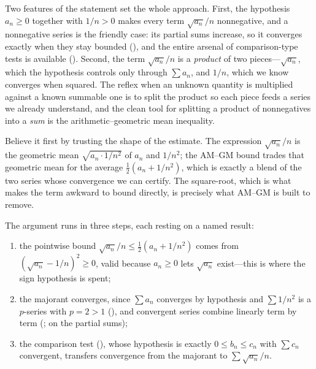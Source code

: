 \documentclass[main.tex]{subfiles}
\begin{document}
\begin{Reflection}
Two features of the statement set the whole approach. First, the hypothesis $a_n\ge 0$ together with
$1/n>0$ makes every term $\sqrt{a_n}/n$ nonnegative, and a nonnegative series is the friendly case: its
partial sums increase, so it converges exactly when they stay bounded (), and the entire
arsenal of comparison-type tests is available (). Second, the term $\sqrt{a_n}/n$ is a
\emph{product} of two pieces---$\sqrt{a_n}$, which the hypothesis controls only through $\sum a_n$, and
$1/n$, which we know converges when squared. The reflex when an unknown quantity is multiplied against a
known summable one is to split the product so each piece feeds a series we already understand, and the
clean tool for splitting a product of nonnegatives into a \emph{sum} is the arithmetic--geometric mean
inequality.

Believe it first by trusting the shape of the estimate. The expression $\sqrt{a_n}/n$ is the geometric
mean $\sqrt{a_n\cdot 1/n^2}$ of $a_n$ and $1/n^2$; the AM--GM bound trades that geometric mean for the
average $\tfrac12(a_n+1/n^2)$, which is exactly a blend of the two series whose convergence we can
certify. The square-root, which is what makes the term awkward to bound directly, is precisely what
AM--GM is built to remove.

The argument runs in three steps, each resting on a named result:
\begin{enumerate}[leftmargin=1.7em,itemsep=3pt,topsep=2pt,label=\textnormal{(\arabic*)}]
  \item the pointwise bound $\sqrt{a_n}/n\le\tfrac12(a_n+1/n^2)$ comes from
        $(\sqrt{a_n}-1/n)^2\ge 0$, valid because $a_n\ge 0$ lets $\sqrt{a_n}$ exist---this is where the
        sign hypothesis is spent;
  \item the majorant converges, since $\sum a_n$ converges by hypothesis and $\sum 1/n^2$ is a
        $p$-series with $p=2>1$ (), and convergent series combine linearly term by term
        (;  on the partial sums);
  \item the comparison test (), whose hypothesis is exactly $0\le b_n\le c_n$ with
        $\sum c_n$ convergent, transfers convergence from the majorant to $\sum\sqrt{a_n}/n$.
\end{enumerate}


\end{Reflection}
\end{document}
